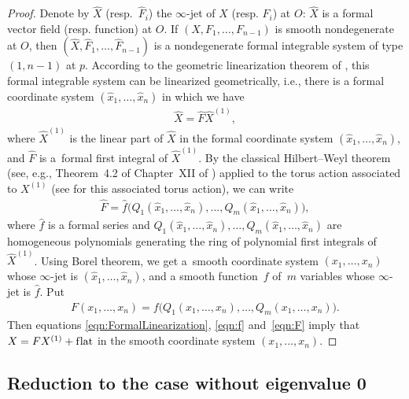 \begin{proof}
Denote by $\hat{X}$ (resp.~$\hat F_i$) the $\infty$-jet of $X$ (resp. $F_i$) at $O$: $\hat{X}$ is a formal vector f\/ield (resp. function)
at $O$. If $(X,F_1,\dots,F_{n-1})$ is smooth nondegenerate at $O$, then
$(\hat{X},\hat{F}_1,\dots,\hat{F}_{n-1})$ is a nondegenerate formal integrable system of type $(1,n-1)$ at $p$.
According to the geometric linearization theorem of \cite{Zung-Nondegenerate2015},
this formal integrable system can be linearized geometrically, i.e., there is a formal coordinate system
$(\hat x_1,\dots, \hat x_n)$ in which we have
\begin{gather} \label{eqn:FormalLinearization}
\hat X = \hat F \hat X^{(1)},
\end{gather}
 where $\hat X^{(1)}$ is the linear part of $\hat X$ in the formal coordinate system
$(\hat x_1,\dots, \hat x_n)$, and $\hat F$ is a~formal f\/irst integral of $\hat X^{(1)}$.
By the classical Hilbert--Weyl theorem (see, e.g., Theorem~4.2 of Chapter~XII of \cite{GSS-Bifurcation1988})
applied to the torus action associated to $X^{(1)}$ (see \cite{Zung-Poincare2002,Zung-Nondegenerate2015} for this associated torus action), we can write
\begin{gather} \label{eqn:f}
 \hat F = \hat f \big(Q_1(\hat x_1,\dots, \hat x_n),\dots, Q_m(\hat x_1,\dots, \hat x_n)\big),
\end{gather}
where $\hat f$ is a formal series and
$Q_1(\hat x_1,\dots, \hat x_n),\dots, Q_m(\hat x_1,\dots, \hat x_n)$ are homogeneous polynomials
generating the ring of polynomial f\/irst integrals of $\hat X^{(1)}$.
Using Borel theorem, we get a~smooth coordinate system $(x_1,\dots,x_n)$ whose $\infty$-jet is
$(\hat x_1,\dots, \hat x_n)$, and a smooth function~$f$ of~$m$ variables whose $\infty$-jet is $\hat f$. Put
\begin{gather} \label{eqn:F}
F (x_1,\dots,x_n) = f\big(Q_1(x_1,\dots,x_n),\dots,Q_m(x_1,\dots,x_n)\big).
\end{gather}
Then equations \eqref{eqn:FormalLinearization}, \eqref{eqn:f} and~\eqref{eqn:F} imply that $X = FX^{(1)} + \text{f\/lat}$
in the smooth coordinate system $(x_1,\dots,x_n)$.
\end{proof}

\subsection{Reduction to the case without eigenvalue 0}\label{subsection:ReductionToParametrizedCase}

